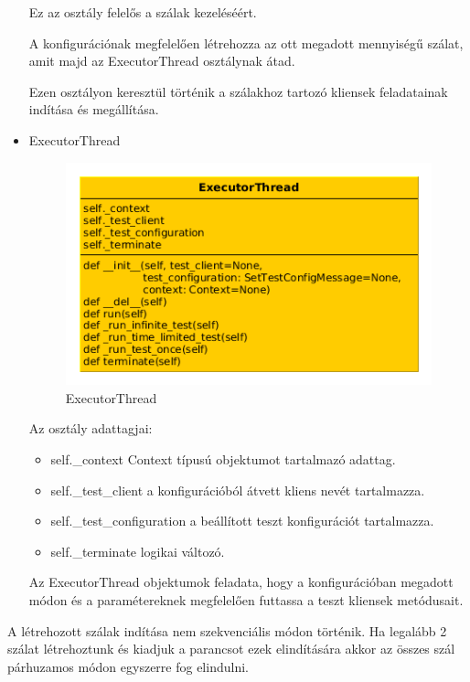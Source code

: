 \documentclass[a4paper,12pt,oneside]{report}
\begin{document}
\begin{itemize}
Ez az osztály felelős a szálak kezeléséért.

A konfigurációnak megfelelően létrehozza az ott megadott mennyiségű szálat, amit majd az ExecutorThread osztálynak átad.

Ezen osztályon keresztül történik a szálakhoz tartozó kliensek feladatainak indítása és megállítása.

        \item ExecutorThread
            \begin{figure}[h]
                  \includegraphics[width=13cm,keepaspectratio]{executorthread.png}
                      \caption{ExecutorThread}
                  \label{fig:executorthread}
            \end{figure}
\newpage
    Az osztály adattagjai:
    
        \begin{itemize}
            \itemsep0em
                \item self.\_context Context típusú objektumot tartalmazó adattag.
                \item self.\_test\_client a konfigurációból átvett kliens nevét tartalmazza.
                \item self.\_test\_configuration a beállított teszt konfigurációt tartalmazza.
                \item self.\_terminate logikai változó.
        \end{itemize}
        
        Az ExecutorThread objektumok feladata, hogy a konfigurációban megadott módon és a paramétereknek megfelelően futtassa a teszt kliensek metódusait.
\end{itemize}

A létrehozott szálak indítása nem szekvenciális módon történik.
Ha legalább 2 szálat létrehoztunk és kiadjuk a parancsot ezek elindítására akkor az összes szál párhuzamos módon egyszerre fog elindulni.
        
\end{document}
